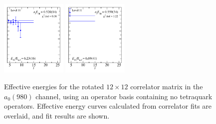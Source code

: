 \begin{figure}
  \includegraphics[width=0.28\textwidth]{figures/spectrum_a1gm/no_tq/fits/fit_10.pdf}
  \includegraphics[width=0.28\textwidth]{figures/spectrum_a1gm/no_tq/fits/fit_11.pdf}
  \caption{Effective energies for the rotated $12\times 12$ correlator matrix in the $a_0(980)$ channel, using an operator basis containing no tetraquark operators. Effective energy curves calculated from correlator fits are overlaid, and fit results are shown.}
  \label{fig:a0_no_tq_grid}
\end{figure}

